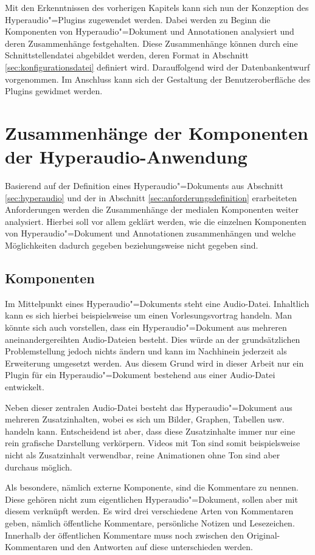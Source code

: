 Mit den Erkenntnissen des vorherigen Kapitels kann sich nun der Konzeption des Hyperaudio"=Plugins zugewendet werden. Dabei werden zu Beginn die Komponenten von Hyperaudio"=Dokument und Annotationen analysiert und deren Zusammenhänge festgehalten. Diese Zusammenhänge können durch eine Schnittstellendatei abgebildet werden, deren Format in Abschnitt \ref{sec:konfigurationsdatei} definiert wird. Darauffolgend wird der Datenbankentwurf vorgenommen. Im Anschluss kann sich der Gestaltung der Benutzeroberfläche des Plugins gewidmet werden.


\section{Zusammenhänge der Komponenten der Hyperaudio-Anwendung}
Basierend auf der Definition eines Hyperaudio"=Dokuments aus Abschnitt \ref{sec:hyperaudio} und der in Abschnitt \ref{sec:anforderungsdefinition} erarbeiteten Anforderungen werden die Zusammenhänge der medialen Komponenten weiter analysiert. Hierbei soll vor allem geklärt werden, wie die einzelnen Komponenten von Hyperaudio"=Dokument und Annotationen zusammenhängen und welche Möglichkeiten dadurch gegeben beziehungsweise nicht gegeben sind.


\subsection{Komponenten}
Im Mittelpunkt eines Hyperaudio"=Dokuments steht eine Audio-Datei. Inhaltlich kann es sich hierbei beispielsweise um einen Vorlesungsvortrag handeln. Man könnte sich auch vorstellen, dass ein Hyperaudio"=Dokument aus mehreren aneinandergereihten Audio-Dateien besteht. Dies würde an der grundsätzlichen Problemstellung jedoch nichts ändern und kann im Nachhinein jederzeit als Erweiterung umgesetzt werden. Aus diesem Grund wird in dieser Arbeit nur ein Plugin für ein Hyperaudio"=Dokument bestehend aus einer Audio-Datei entwickelt.

Neben dieser zentralen Audio-Datei besteht das Hyperaudio"=Dokument aus mehreren Zusatzinhalten, wobei es sich um Bilder, Graphen, Tabellen usw. handeln kann. Entscheidend ist aber, dass diese Zusatzinhalte immer nur eine rein grafische Darstellung verkörpern. Videos mit Ton sind somit beispielsweise nicht als Zusatzinhalt verwendbar, reine Animationen ohne Ton sind aber durchaus möglich.

Als besondere, nämlich externe Komponente, sind die Kommentare zu nennen. Diese gehören nicht zum eigentlichen Hyperaudio"=Dokument, sollen aber mit diesem verknüpft werden. Es wird drei verschiedene Arten von Kommentaren geben, nämlich  öffentliche Kommentare, persönliche Notizen und Lesezeichen. Innerhalb der öffentlichen Kommentare muss noch zwischen den Original-Kommentaren und den Antworten auf diese unterschieden werden. 


